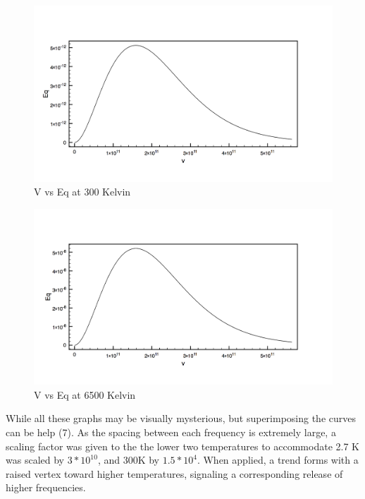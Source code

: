 \documentclass[12pt]{article}
\begin{document}
\begin{figure}[H]
	\centering 
	\includegraphics[width=1.\textwidth]{22.png}
	\caption{ V vs Eq at 300 Kelvin}
\end{figure}

\begin{figure}[H]
	\centering 
	\includegraphics[width=1.\textwidth]{23.png}
	\caption{ V vs Eq at 6500 Kelvin}
\end{figure}


While all these graphs may be visually mysterious, but superimposing the curves can be help (7). As the spacing between each frequency is extremely large, a scaling factor was given to the the lower two temperatures to accommodate 2.7 K was scaled by ${}3*10^{10}{}$, and  300K by ${}1.5*10^{4}{}$. When applied, a trend forms with a raised vertex toward higher temperatures, signaling a corresponding release of higher frequencies.  
\end{document}
